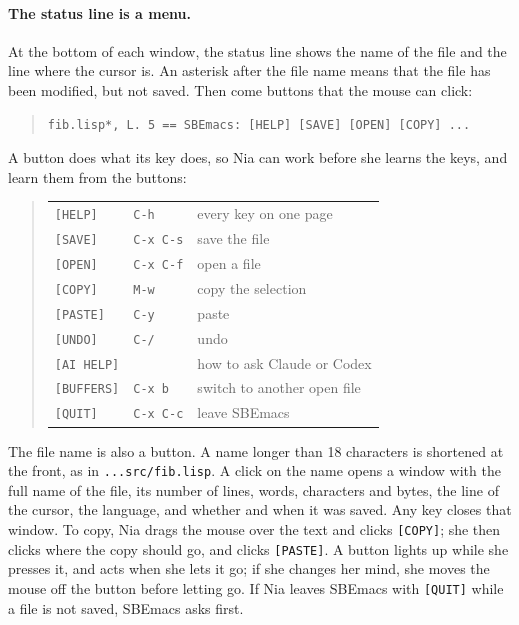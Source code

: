 \documentclass[a4paper,12pt,openany]{book}
\begin{document}
\paragraph{The status line is a menu.} At the bottom of each window,
the status line shows the name of the file and the line where the
cursor is. An asterisk after the file name means that the file has
been modified, but not saved. Then come buttons that the mouse can
click:
\begin{quote}
\begin{verbatim}
fib.lisp*, L. 5 == SBEmacs: [HELP] [SAVE] [OPEN] [COPY] ...
\end{verbatim}
\end{quote}
A button does what its key does, so Nia can work before she
learns the keys, and learn them from the buttons:
\begin{quote}
\begin{tabular}{lll}
\verb|[HELP]|    & \verb|C-h|     & every key on one page\\
\verb|[SAVE]|    & \verb|C-x C-s| & save the file\\
\verb|[OPEN]|    & \verb|C-x C-f| & open a file\\
\verb|[COPY]|    & \verb|M-w|     & copy the selection\\
\verb|[PASTE]|   & \verb|C-y|     & paste\\
\verb|[UNDO]|    & \verb|C-/|     & undo\\
\verb|[AI HELP]| &                & how to ask Claude or Codex\\
\verb|[BUFFERS]| & \verb|C-x b|   & switch to another open file\\
\verb|[QUIT]|    & \verb|C-x C-c| & leave SBEmacs
\end{tabular}
\end{quote}
The file name is also a button. A name longer than 18
characters is shortened at the front, as in
\verb|...src/fib.lisp|. A click on the name opens a window with the
full name of the file, its number of lines, words, characters and
bytes, the line of the cursor, the language, and whether and when it
was saved. Any key closes that window.
To copy, Nia drags the mouse over the text and clicks
\verb|[COPY]|; she then clicks where the copy should go, and clicks
\verb|[PASTE]|. A button lights up while she presses it, and acts
when she lets it go; if she changes her mind, she moves the mouse
off the button before letting go. If Nia leaves SBEmacs with
\verb|[QUIT]| while a file is not saved, SBEmacs asks first.
\end{document}
